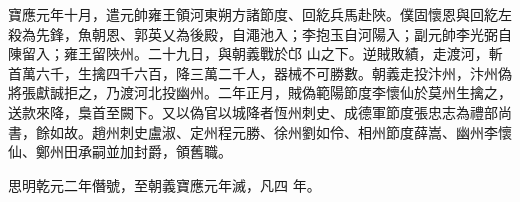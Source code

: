 \begin{pinyinscope}
 寶應元年十月，遣元帥雍王領河東朔方諸節度、回紇兵馬赴陜。僕固懷恩與回紇左殺為先鋒，魚朝恩、郭英乂為後殿，自澠池入；李抱玉自河陽入；副元帥李光弼自陳留入；雍王留陜州。二十九日，與朝義戰於邙
 山之下。逆賊敗績，走渡河，斬首萬六千，生擒四千六百，降三萬二千人，器械不可勝數。朝義走投汴州，汴州偽將張獻誠拒之，乃渡河北投幽州。二年正月，賊偽範陽節度李懷仙於莫州生擒之，送款來降，梟首至闕下。又以偽官以城降者恆州刺史、成德軍節度張忠志為禮部尚書，餘如故。趙州刺史盧淑、定州程元勝、徐州劉如伶、相州節度薛嵩、幽州李懷仙、鄭州田承嗣並加封爵，領舊職。



 思明乾元二年僭號，至朝義寶應元年滅，凡四
 年。



\end{pinyinscope}